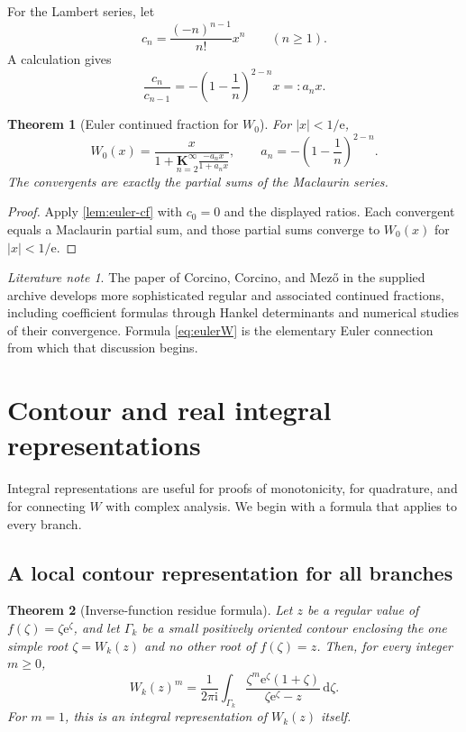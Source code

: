 \documentclass[11pt]{article}
\newtheorem{theorem}{Theorem}[section]
\theoremstyle{remark}
\newtheorem{literaturenote}[literaturenote]{Literature note}
\newcommand{\Wz}{W_0}
\newcommand{\ee}{\mathrm e}
\newcommand{\ii}{\mathrm i}
\newcommand{\abs}[1]{\left|#1\right|}
\newcommand{\dd}{\,\mathrm d}
\begin{document}
For the Lambert series, let
\[
       c_n=\frac{(-n)^{n-1}}{n!}x^n\qquad(n\geq1).
\]
A calculation gives
\[
 \frac{c_n}{c_{n-1}}
 =-\left(1-\frac1n\right)^{2-n}x=:a_nx.
\]

\begin{theorem}[Euler continued fraction for \(W_0\)]\label{thm:eulerW}
For \(\abs{x}<1/\ee\),
\begin{equation}\label{eq:eulerW}
 \boxed{\displaystyle
 \Wz(x)=
 \frac{x}{
  1+\underset{n=2}{\mathbf K^\infty}
  \frac{-a_nx}{1+a_nx}},
 \qquad
 a_n=-\left(1-\frac1n\right)^{2-n}.}
\end{equation}
The convergents are exactly the partial sums of the Maclaurin series.
\end{theorem}

\begin{proof}
Apply \cref{lem:euler-cf} with \(c_0=0\) and the displayed ratios.
Each convergent equals a Maclaurin partial sum, and those partial sums
converge to \(\Wz(x)\) for \(\abs{x}<1/\ee\).
\end{proof}

\begin{literaturenote}
The paper of Corcino, Corcino, and Mez\H{o} in the supplied archive develops
more sophisticated regular and associated continued fractions, including
coefficient formulas through Hankel determinants and numerical studies of
their convergence.  Formula \eqref{eq:eulerW} is the elementary Euler
connection from which that discussion begins.
\end{literaturenote}


\section{Contour and real integral representations}\label{sec:integralreps}

Integral representations are useful for proofs of monotonicity, for
quadrature, and for connecting \(W\) with complex analysis.  We begin with a
formula that applies to every branch.

\subsection{A local contour representation for all branches}

\begin{theorem}[Inverse-function residue formula]\label{thm:contour-all}
Let \(z\) be a regular value of \(f(\zeta)=\zeta\ee^\zeta\), and let
\(\Gamma_k\) be a small positively oriented contour enclosing the one simple
root \(\zeta=W_k(z)\) and no other root of \(f(\zeta)=z\).  Then, for every
integer \(m\geq0\),
\begin{equation}\label{eq:contour-all}
 W_k(z)^m
 =\frac{1}{2\pi\ii}\int_{\Gamma_k}
 \frac{\zeta^m\ee^\zeta(1+\zeta)}
      {\zeta\ee^\zeta-z}\dd\zeta.
\end{equation}
For \(m=1\), this is an integral representation of \(W_k(z)\) itself.
\end{theorem}
\end{document}
